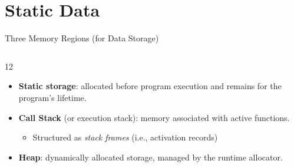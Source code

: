 \documentclass[14pt,aspectratio=1610]{beamer}
\begin{document}
\section{Static Data}

\begin{frame}{Three Memory Regions (for Data Storage)}
\begin{columns}
\begin{overlayarea}{\linewidth}{12\baselineskip}
  \begin{itemize}[<+->]
  \item
    \textbf{Static storage}: allocated before program execution and remains for the program's lifetime.
  \item
    \textbf{Call Stack} (or execution stack): memory associated with active functions.
    \begin{itemize}
      \item Structured as \emph{stack frames} (i.e., activation records)
    \end{itemize}
  \item
    \textbf{Heap}: dynamically allocated storage, managed by the runtime allocator.
  \end{itemize}
\end{overlayarea}
  \vspace{1.5em}
  
\end{columns}

\end{frame}
\end{document}
